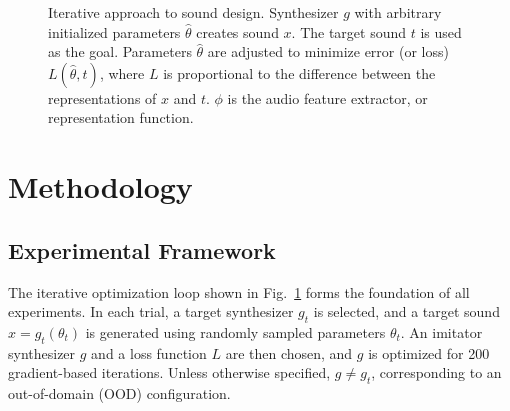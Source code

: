 \documentclass[runningheads]{llncs}
\begin{document}
\begin{figure}[ht]
    \centering
{}

\caption[Iterative approach to sound design.]{
Iterative approach to sound design. Synthesizer \(g\) with arbitrary initialized parameters \(\hat{\theta}\)
creates sound \(x\). The target sound \(t\) is used as the goal.
Parameters \(\hat{\theta}\) are adjusted to minimize error (or loss)
\(L(\hat{\theta},t)\), where \(L\) is proportional to the difference between
the representations of \(x\) and \(t\). \(\phi\) is the audio feature extractor, or representation function.
}
\label{fig:sound_design_loop_iterative}
\end{figure}



\section{Methodology}
\label{sec:experiment_setup}

\subsection{Experimental Framework}
The iterative optimization loop shown in Fig.~\ref{fig:sound_design_loop_iterative} forms the foundation of all experiments.  
In each trial, a target synthesizer $g_t$ is selected, and a target sound $x = g_t(\theta_t)$ is generated using randomly sampled parameters $\theta_t$.  
An imitator synthesizer $g$ and a loss function $L$ are then chosen, and $g$ is optimized for 200 gradient-based iterations.  
Unless otherwise specified, $g \neq g_t$, corresponding to an out-of-domain (OOD) configuration.
\end{document}
